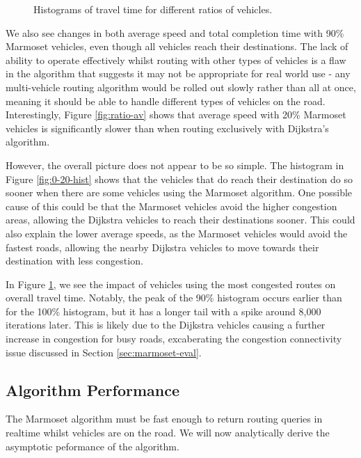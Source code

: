 \documentclass[ %
                    author={Alexander Hill},
                supervisor={Dr. Benjamin Sach},
                    degree={MEng},
                     title={MARMOSET},
                  subtitle={Multi-Agent Route Management using Online Simulation for Efficient Transportation},
                      type={research},
                      year={2016} ]{dissertation}
\begin{document}
\begin{figure}[h]
\begin{subfigure}[b]{0.45\textwidth}
        \caption{}\label{fig:90-100-hist}
    \end{subfigure}
    \caption{Histograms of travel time for different ratios of vehicles.}\label{fig:ratio-hists}
\end{figure}

We also see changes in both average speed and total completion time with 90\%
Marmoset vehicles, even though all vehicles reach their destinations. The lack
of ability to operate effectively whilst routing with other types of vehicles is
a flaw in the algorithm that suggests it may not be appropriate for real world
use - any multi-vehicle routing algorithm would be rolled out slowly rather than
all at once, meaning it should be able to handle different types of vehicles on
the road. Interestingly, Figure \ref{fig:ratio-av} shows that average speed with
20\% Marmoset vehicles is significantly slower than when routing exclusively
with Dijkstra's algorithm.

However, the overall picture does not appear to be so simple. The histogram in
Figure \ref{fig:0-20-hist} shows that the vehicles that do reach their
destination do so sooner when there are some vehicles using the Marmoset
algorithm. One possible cause of this could be that the Marmoset vehicles avoid
the higher congestion areas, allowing the Dijkstra vehicles to reach their
destinations sooner. This could also explain the lower average speeds, as the
Marmoset vehicles would avoid the fastest roads, allowing the nearby Dijkstra
vehicles to move towards their destination with less congestion.

In Figure \ref{fig:90-100-hist}, we see the impact of vehicles using the most
congested routes on overall travel time. Notably, the peak of the 90\% histogram
occurs earlier than for the 100\% histogram, but it has a longer tail with a
spike around 8,000 iterations later. This is likely due to the Dijkstra vehicles
causing a further increase in congestion for busy roads, excaberating the
congestion connectivity issue discussed in Section \ref{sec:marmoset-eval}.

\subsection{Algorithm Performance}

The Marmoset algorithm must be fast enough to return routing queries in realtime
whilst vehicles are on the road. We will now analytically derive the asymptotic
peformance of the algorithm.
\end{document}
